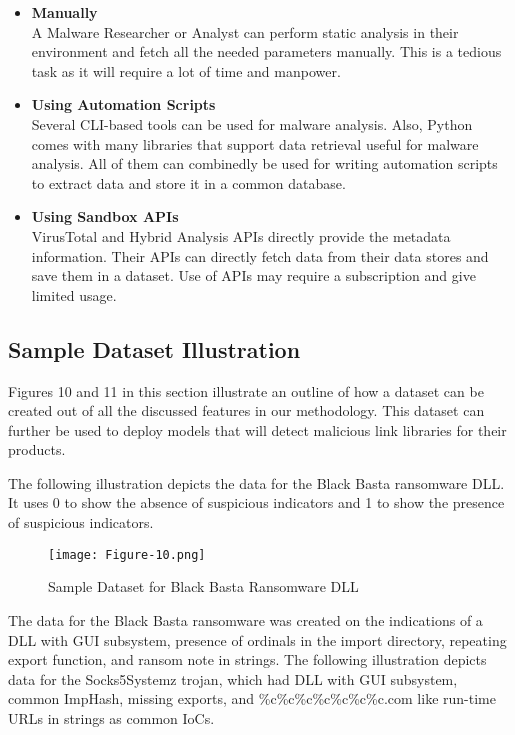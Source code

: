 \documentclass{article}
\begin{document}
\begin{itemize}
    \item \textbf{Manually} \\
    A Malware Researcher or Analyst can perform static analysis in their environment and fetch all the needed parameters manually. This is a tedious task as it will require a lot of time and manpower.
    
    \item \textbf{Using Automation Scripts} \\
    Several CLI-based tools can be used for malware analysis. Also, Python comes with many libraries that support data retrieval useful for malware analysis. All of them can combinedly be used for writing automation scripts to extract data and store it in a common database.
    
    \item \textbf{Using Sandbox APIs} \\
    VirusTotal and Hybrid Analysis APIs directly provide the metadata information. Their APIs can directly fetch data from their data stores and save them in a dataset. Use of APIs may require a subscription and give limited usage.
\end{itemize}

\subsection{Sample Dataset Illustration}

Figures 10 and 11 in this section illustrate an outline of how a dataset can be created out of all the discussed features in our methodology. This dataset can further be used to deploy models that will detect malicious link libraries for their products.

The following illustration depicts the data for the Black Basta ransomware DLL. It uses 0 to show the absence of suspicious indicators and 1 to show the presence of suspicious indicators.

\begin{figure}[h]
    \centering
    \texttt{[image: Figure-10.png]}
    \caption{Sample Dataset for Black Basta Ransomware DLL}
\end{figure}

The data for the Black Basta ransomware was created on the indications of a DLL with GUI subsystem, presence of ordinals in the import directory, repeating export function, and ransom note in strings. The following illustration depicts data for the Socks5Systemz trojan, which had DLL with GUI subsystem, common ImpHash, missing exports, and \%c\%c\%c\%c\%c\%c\%c.com like run-time URLs in strings as common IoCs.
\end{document}
